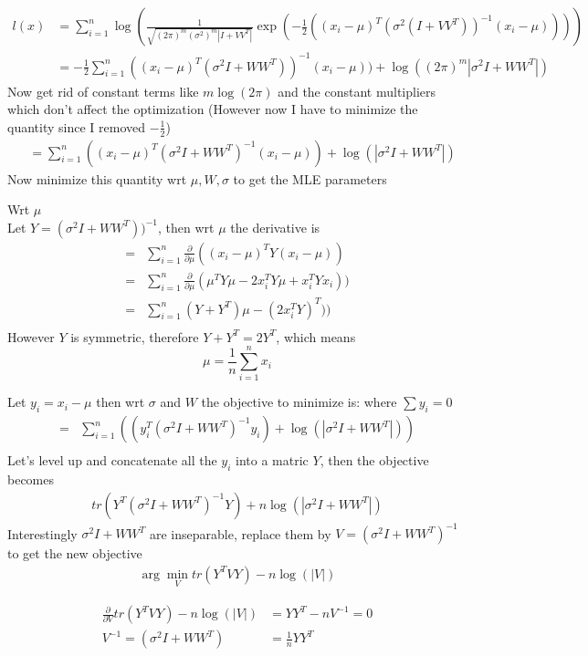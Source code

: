 \documentclass[11pt]{article}
\renewcommand{\det}[1]{|#1|}
\newcommand{\mf}{-\frac{1}{2}}
\begin{document}
\begin{align}
  l(x) &= \sum_{i=1}^n \log(\frac{1}{\sqrt{(2\pi)^{m}(\sigma^2)^m \det{I+VV^T}}}  \exp(\mf ((x_i-\mu)^T (\sigma^2 (I+VV^T))^{-1}  (x_i-\mu))))\\
  &= \mf \sum_{i=1}^n ((x_i-\mu)^T (\sigma^2I+WW^T))^{-1}  (x_i-\mu)) + \log((2\pi)^{m} \det{\sigma^2I+WW^T})
\end{align}
Now get rid of constant terms like $m\log(2\pi)$ and the constant
multipliers which don't affect the optimization (However now I have to
minimize the quantity since I removed $\mf$)
\begin{align}
  &= \sum_{i=1}^n ((x_i-\mu)^T (\sigma^2I+WW^T)^{-1}  (x_i-\mu)) + \log(\det{\sigma^2I+WW^T})
\end{align}
Now minimize this quantity wrt $\mu, W, \sigma$ to get the MLE
parameters

Wrt $\mu$\\
Let $Y=(\sigma^2I+WW^T))^{-1}$, then wrt $\mu$ the derivative is
\begin{align}
  =& \sum_{i=1}^n \frac{\partial}{\partial \mu}  ((x_i-\mu)^T Y  (x_i-\mu)) \\
  =& \sum_{i=1}^n \frac{\partial}{\partial \mu}  (\mu^T Y\mu -
  2x_i^TY\mu + x_i^TYx_i)) \\
  =& \sum_{i=1}^n  (Y+Y^T)\mu -  (2x_i^TY)^T )) \\
\end{align}
However $Y$ is symmetric, therefore $Y+Y^T = 2Y^T$, which means
$$\mu = \frac{1}{n}{\sum_{i=1}^n x_i}$$


Let $y_i = x_i - \mu$ then wrt $\sigma$ and $W$ the objective to
minimize is: where $\sum y_i = 0$
\begin{align}
  =& \sum_{i=1}^n \left(  (y_i^T
  (\sigma^2I+WW^T)^{-1}  y_i) + \log(\det{\sigma^2I+WW^T}) \right)\\
\end{align}
Let's level up and concatenate all the $y_i$ into a matric $Y$, then
the objective becomes
\begin{align}
  tr(Y^T (\sigma^2I+WW^T)^{-1}Y) + n\log(\det{\sigma^2I+WW^T})
\end{align}
Interestingly $\sigma^2I+WW^T$ are inseparable, replace them by $V = (\sigma^2I+WW^T)^{-1}$ to
get the new objective
\begin{align}
  \arg\min_V tr(Y^TVY) - n\log(\det{V})
\end{align}

\begin{align}
  \frac{\partial}{\partial V} tr(Y^TVY) - n\log(\det{V}) &= YY^T - n
  V^{-1} = 0\\
  V^{-1} = (\sigma^2I+WW^T) &= \frac{1}{n}YY^T
\end{align}
\end{document}
